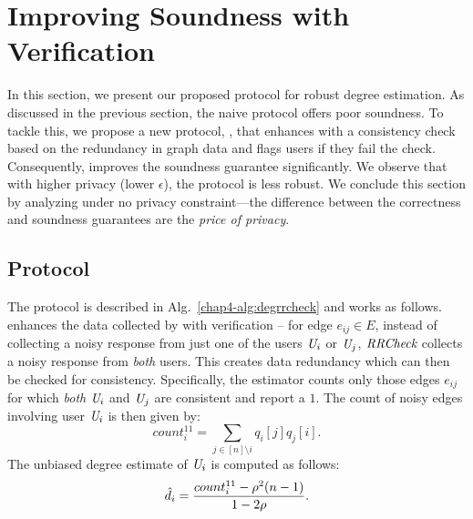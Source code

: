 
\section{Improving Soundness with Verification}\label{chap4-sec:robust-rr-checks}

In this section, we present our proposed protocol for robust degree estimation. 
As discussed in the previous section, the naive \DegRRNaive{} protocol offers poor soundness. To tackle
this, we propose a new protocol, \DegRRCheck, that enhances
\DegRRNaive{} with a consistency check based on the
redundancy in graph data and flags users if they fail the check. Consequently, \DegRRNaive{} improves the soundness guarantee significantly. We observe that with higher privacy (lower $\epsilon$), the protocol is less robust. We conclude this section by analyzing \DegRRCheck{} under no privacy constraint---the difference between the correctness and soundness guarantees are the \emph{price of privacy}.

    \subsection{\DegRRCheck{} Protocol} \label{chap4-sec:protocol:check} 
The \DegRRCheck{} protocol is described in Alg.~\ref{chap4-alg:degrrcheck} and works as follows. \DegRRCheck{} enhances the data collected by \DegRRNaive{} with verification -- for edge $e_{ij} \in E$, instead of collecting a noisy response from just one of the users
$\textit{U}_i$ or $\textit{U}_j$, $\textit{RRCheck}{}$ collects a noisy response from \emph{both} users. This creates
data redundancy which can then be checked for consistency. Specifically, the estimator counts only those edges $e_{ij}$ for which \textit{both} $\textit{U}_i$ and $\textit{U}_j$ are consistent and report a $1$. 
 The count of noisy edges involving user $\textit{U}_i$ is then given by:
\[count_i^{11} = \sum_{j\in [n]\setminus i} q_{i}[j] q_{j}[i].\]
The unbiased degree estimate of $\textit{U}_i$ is computed as follows:
\begin{equation}\label{chap4-eq:deg-est}
    \hat{d}_i = \frac{count_i^{11} - \rho^2(n-1)}{1-2\rho}.
\end{equation}



